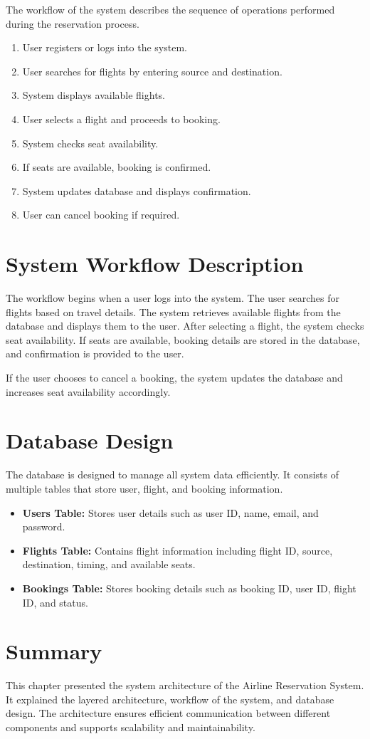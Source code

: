 The workflow of the system describes the sequence of operations performed during the reservation process.

\begin{enumerate}
\item User registers or logs into the system.
\item User searches for flights by entering source and destination.
\item System displays available flights.
\item User selects a flight and proceeds to booking.
\item System checks seat availability.
\item If seats are available, booking is confirmed.
\item System updates database and displays confirmation.
\item User can cancel booking if required.
\end{enumerate}

\section{System Workflow Description}

The workflow begins when a user logs into the system. The user searches for flights based on travel details. The system retrieves available flights from the database and displays them to the user. After selecting a flight, the system checks seat availability. If seats are available, booking details are stored in the database, and confirmation is provided to the user.

If the user chooses to cancel a booking, the system updates the database and increases seat availability accordingly.

\section{Database Design}

The database is designed to manage all system data efficiently. It consists of multiple tables that store user, flight, and booking information.

\begin{itemize}
\item \textbf{Users Table:} Stores user details such as user ID, name, email, and password.
\item \textbf{Flights Table:} Contains flight information including flight ID, source, destination, timing, and available seats.
\item \textbf{Bookings Table:} Stores booking details such as booking ID, user ID, flight ID, and status.
\end{itemize}

\section{Summary}

This chapter presented the system architecture of the Airline Reservation System. It explained the layered architecture, workflow of the system, and database design. The architecture ensures efficient communication between different components and supports scalability and maintainability.